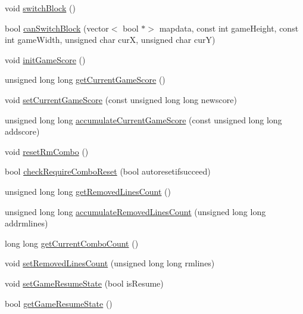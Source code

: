 \begin{DoxyCompactItemize}
void \hyperlink{class_tetris_1_1_users_1_1_game_user_a1d1efa857420c82248fd12da9c08ef77}{switch\+Block} ()
\item 
bool \hyperlink{class_tetris_1_1_users_1_1_game_user_a1962ed051506010440645f7f3b50760d}{can\+Switch\+Block} (vector$<$ bool $\ast$$>$ mapdata, const int game\+Height, const int game\+Width, unsigned char curX, unsigned char curY)
\item 
void \hyperlink{class_tetris_1_1_users_1_1_game_user_a746fd00bc5c7efda0cc28fe7bbb855ac}{init\+Game\+Score} ()
\item 
unsigned long long \hyperlink{class_tetris_1_1_users_1_1_game_user_a93bde8123ee0dc9333d62a44b904023c}{get\+Current\+Game\+Score} ()
\item 
void \hyperlink{class_tetris_1_1_users_1_1_game_user_aa37f3ed5891a4efecc09f92188b8a9cd}{set\+Current\+Game\+Score} (const unsigned long long newscore)
\item 
unsigned long long \hyperlink{class_tetris_1_1_users_1_1_game_user_a5808d26769ba24d9e6435e40d3feb7af}{accumulate\+Current\+Game\+Score} (const unsigned long long addscore)
\item 
void \hyperlink{class_tetris_1_1_users_1_1_game_user_a91a7cf9f13654b44b43ac0d2f1125206}{reset\+Rm\+Combo} ()
\item 
bool \hyperlink{class_tetris_1_1_users_1_1_game_user_a82ea0dfdb99643a1b577a22f5e504346}{check\+Require\+Combo\+Reset} (bool autoresetifsucceed)
\item 
unsigned long long \hyperlink{class_tetris_1_1_users_1_1_game_user_a5912def4d9d77adbb4323b35366724af}{get\+Removed\+Lines\+Count} ()
\item 
unsigned long long \hyperlink{class_tetris_1_1_users_1_1_game_user_a89c6053fbb03b4fbfcd3fec883a87765}{accumulate\+Removed\+Lines\+Count} (unsigned long long addrmlines)
\item 
long long \hyperlink{class_tetris_1_1_users_1_1_game_user_a761f78f405c3d4445ae147b2c11e8364}{get\+Current\+Combo\+Count} ()
\item 
void \hyperlink{class_tetris_1_1_users_1_1_game_user_a298debc64e974b4f626e8f77687ea503}{set\+Removed\+Lines\+Count} (unsigned long long rmlines)
\item 
void \hyperlink{class_tetris_1_1_users_1_1_game_user_a10d5ff75a132346fd1947ea14bcea7ab}{set\+Game\+Resume\+State} (bool is\+Resume)
\item 
bool \hyperlink{class_tetris_1_1_users_1_1_game_user_a12cc139cfa5d31708d0e53b07e110ab3}{get\+Game\+Resume\+State} ()
\item 
$$
\end{DoxyCompactItemize}
